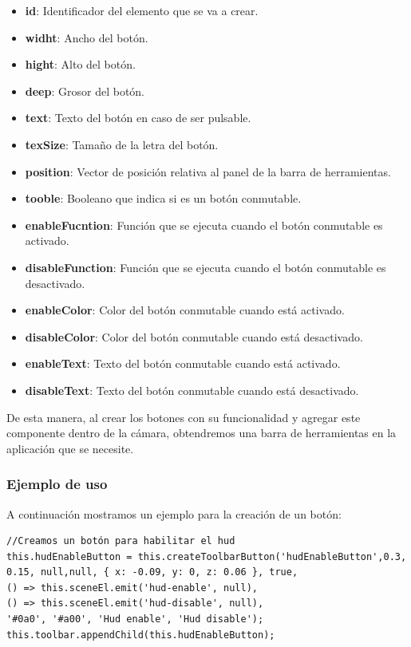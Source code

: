 \documentclass[a4paper, 11pt]{book}
\begin{document}
\begin{itemize}
	\item \textbf{id}: Identificador del elemento que se va a crear.
	\item \textbf{widht}: Ancho del botón.
	\item \textbf{hight}: Alto del botón.
	\item \textbf{deep}: Grosor del botón.
	\item \textbf{text}: Texto del botón en caso de ser pulsable.
	\item \textbf{texSize}: Tamaño de la letra del botón.
	\item \textbf{position}: Vector de posición relativa al panel de la barra de herramientas.
	\item \textbf{tooble}: Booleano que indica si es un botón conmutable.
	\item \textbf{enableFucntion}: Función que se ejecuta cuando el botón conmutable es activado.
	\item \textbf{disableFunction}: Función que se ejecuta cuando el botón conmutable es desactivado.
	\item \textbf{enableColor}: Color del botón conmutable cuando está activado.
	\item \textbf{disableColor}: Color del botón conmutable cuando está desactivado.
	\item \textbf{enableText}: Texto del botón conmutable cuando está activado.
	\item \textbf{disableText}: Texto del botón conmutable cuando está desactivado.
\end{itemize}

De esta manera, al crear los botones con su funcionalidad y agregar este componente dentro de la cámara, obtendremos una barra de herramientas en la aplicación que se necesite.
\subsubsection{Ejemplo de uso}
A continuación mostramos un ejemplo para la creación de un botón:
\begin{verbatim}
//Creamos un botón para habilitar el hud
this.hudEnableButton = this.createToolbarButton('hudEnableButton',0.3, 0.15, null,null, { x: -0.09, y: 0, z: 0.06 }, true,
() => this.sceneEl.emit('hud-enable', null),
() => this.sceneEl.emit('hud-disable', null),
'#0a0', '#a00', 'Hud enable', 'Hud disable');
this.toolbar.appendChild(this.hudEnableButton);
\end{verbatim}
\end{document}
